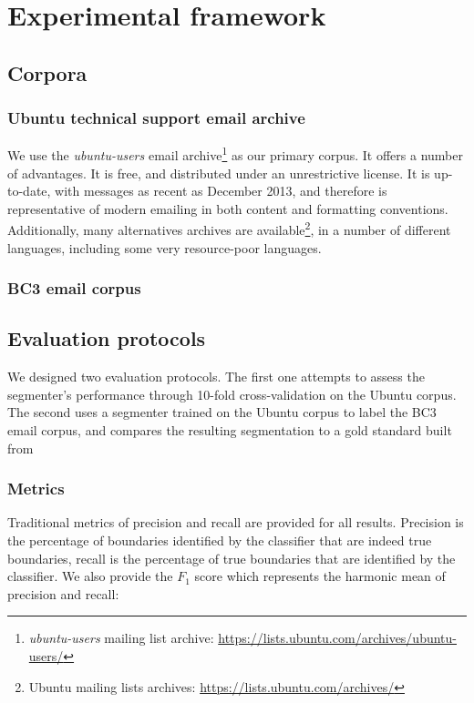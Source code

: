 

\section{Experimental framework}

\subsection{Corpora}

\subsubsection{Ubuntu technical support email archive}

We use the \textit{ubuntu-users} email archive\footnote{\textit{ubuntu-users} mailing list archive: \url{https://lists.ubuntu.com/archives/ubuntu-users/}} as our primary corpus. It offers a number of advantages. It is free, and distributed under an unrestrictive license. It is up-to-date, with messages as recent as December 2013, and therefore is representative of modern emailing in both content and formatting conventions. Additionally, many alternatives archives are available\footnote{Ubuntu mailing lists archives: \url{https://lists.ubuntu.com/archives/}}, in a number of different languages, including some very resource-poor languages.

\subsubsection{BC3 email corpus}


\subsection{Evaluation protocols}

We designed two evaluation protocols. The first one attempts to assess the segmenter's performance through 10-fold cross-validation on the Ubuntu corpus. The second uses a segmenter trained on the Ubuntu corpus to label the BC3 email corpus, and compares the resulting segmentation to a gold standard built  from

\subsubsection{Metrics}

Traditional metrics of precision and recall are provided for all results. Precision is the percentage of boundaries identified by the classifier that are indeed true boundaries, recall is the percentage of true boundaries that are identified by the classifier. We also provide the $F_1$ score which represents the harmonic mean of precision and recall:

